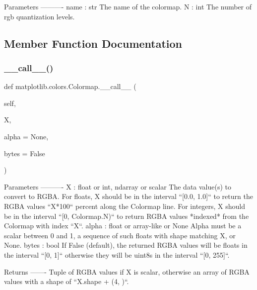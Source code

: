 \begin{DoxyVerb}Parameters
----------
name : str
    The name of the colormap.
N : int
    The number of rgb quantization levels.
\end{DoxyVerb}
 

\subsection{Member Function Documentation}
\mbox{\label{classmatplotlib_1_1colors_1_1Colormap_a6f531c90c97169b34de276c1380b395b}} 
\subsubsection{\texorpdfstring{\+\_\+\+\_\+call\+\_\+\+\_\+()}{\_\_call\_\_()}}
{\footnotesize\ttfamily def matplotlib.\+colors.\+Colormap.\+\_\+\+\_\+call\+\_\+\+\_\+ (\begin{DoxyParamCaption}\item[{}]{self,  }\item[{}]{X,  }\item[{}]{alpha = {\ttfamily None},  }\item[{}]{bytes = {\ttfamily False} }\end{DoxyParamCaption})}

\begin{DoxyVerb}Parameters
----------
X : float or int, ndarray or scalar
    The data value(s) to convert to RGBA.
    For floats, X should be in the interval ``[0.0, 1.0]`` to
    return the RGBA values ``X*100`` percent along the Colormap line.
    For integers, X should be in the interval ``[0, Colormap.N)`` to
    return RGBA values *indexed* from the Colormap with index ``X``.
alpha : float or array-like or None
    Alpha must be a scalar between 0 and 1, a sequence of such
    floats with shape matching X, or None.
bytes : bool
    If False (default), the returned RGBA values will be floats in the
    interval ``[0, 1]`` otherwise they will be uint8s in the interval
    ``[0, 255]``.

Returns
-------
Tuple of RGBA values if X is scalar, otherwise an array of
RGBA values with a shape of ``X.shape + (4, )``.
\end{DoxyVerb}
 \mbox{\label{classmatplotlib_1_1colors_1_1Colormap_af0caf818eeb96729b83ec398b4009eec}} 
